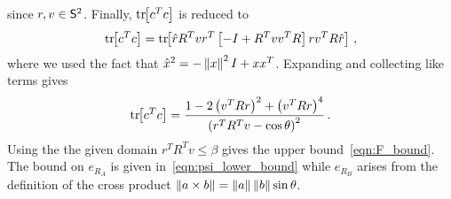 \documentclass[letterpaper, 10 pt, conference]{ieeeconf}  %
\begin{document}
	since \( r,v \in \mathsf{S}^2\).
	Finally, \( \mathrm{tr}\negthickspace\left[ c^T c \right] \) is reduced to
	\begin{gather*}
		\mathrm{tr}\negthickspace\left[ c^T c \right] = \mathrm{tr}\negthickspace\left[ \hat{r} R^T v r^T \left[ -I + R^T v v^T R \right] r v^T R \hat{r} \right] \, ,
	\end{gather*}
	where we used the fact that \( \hat{x}^2 = - \left\| x \right\|^2 I + x x^T\).
	Expanding and collecting like terms gives
	\begin{gather*}
		\mathrm{tr}\negthickspace\left[ c^T c  \right] = \frac{1 - 2\left( v^T R r \right)^2 + \left( v^T R r \right)^4}{\left( r^T R^T v - \cos \theta \right)^2} \, . 
	\end{gather*}
	Using the the given domain \( r^T R^T v \leq \beta \) gives the upper bound~\cref{eqn:F_bound}.
	The bound on \( e_{R_A} \) is given in~\cref{eqn:psi_lower_bound} while \( e_{R_B} \) arises from the definition of the cross product \( \left\| a \times b \right\| = \left\| a \right\| \left\| b \right\| \sin \theta \).
\end{document}
